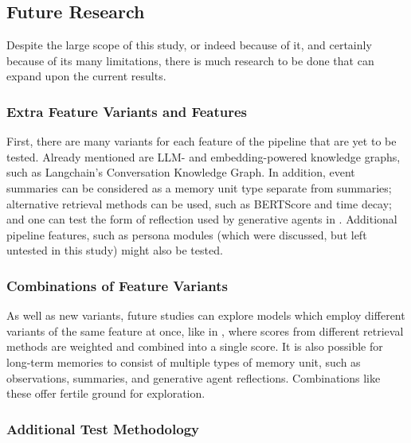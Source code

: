 
\subsection{Future Research}

Despite the large scope of this study, or indeed because of it, and certainly because of its many limitations, there is much research to be done that can expand upon the current results.


\subsubsection{Extra Feature Variants and Features}

First, there are many variants for each feature of the pipeline that are yet to be tested. Already mentioned are LLM- and embedding-powered knowledge graphs, such as Langchain's Conversation Knowledge Graph. In addition, event summaries can be considered as a memory unit type separate from summaries; alternative retrieval methods can be used, such as BERTScore and time decay; and one can test the form of reflection used by generative agents in \cite{Park2023}. Additional pipeline features, such as persona modules (which were discussed, but left untested in this study) might also be tested.
	
	
\subsubsection{Combinations of Feature Variants}

As well as new variants, future studies can explore models which employ different variants of the same feature at once, like in \cite{Park2023}, where scores from different retrieval methods are weighted and combined into a single score. It is also possible for long-term memories to consist of multiple types of memory unit, such as observations, summaries, and generative agent reflections. Combinations like these offer fertile ground for exploration.	
			

\subsubsection{Additional Test Methodology}

